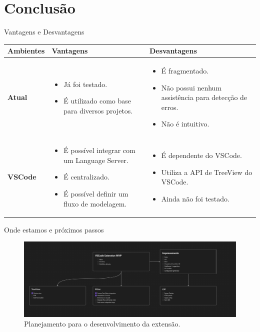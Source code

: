 \documentclass{beamer}
\begin{document}
\section{Conclusão}
\begin{frame}{Vantagens e Desvantagens}
  \begin{table}[h!]
      \centering
      \begin{tabular}{|p{2cm}|p{4cm}|p{4.5cm}|}
        \hline
        \textbf{Ambientes} & \textbf{Vantagens} & \textbf{Desvantagens} \\
        \hline
        \textbf{Atual} & 
          \begin{itemize}
            \item Já foi testado.
            \item É utilizado como base para diversos projetos.
          \end{itemize}&
          \begin{itemize}
            \item É fragmentado.
            \item Não possui nenhum assistência para detecção de erros.
            \item Não é intuitivo.
          \end{itemize}\\
        \hline
        \textbf{VSCode} & 
          \begin{itemize}
            \item É possível integrar com um Language Server.
            \item É centralizado.
            \item É possível definir um fluxo de modelagem.
          \end{itemize}&
          \begin{itemize}
            \item É dependente do VSCode.
            \item Utiliza a API de TreeView do VSCode.
            \item Ainda não foi testado.
          \end{itemize}\\
        \hline
      \end{tabular}
    \end{table}
\end{frame}
\begin{frame}{Onde estamos e próximos passos}
  \begin{figure}[!h]
    \centering
    \includegraphics[width=1\textwidth]{VSCode extension.png} 
    \caption{Planejamento para o desenvolvimento da extensão.}
  \end{figure}
\end{frame}
\end{document}
